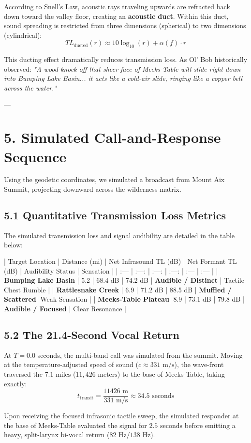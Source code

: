 \documentclass[11pt,twocolumn]{article}
\begin{document}
According to Snell's Law, acoustic rays traveling upwards are refracted back down toward the valley floor, creating an \textbf{acoustic duct}. Within this duct, sound spreading is restricted from three dimensions (spherical) to two dimensions (cylindrical):
$$TL_{\text{ducted}}(r) \approx 10 \log_{10}(r) + \alpha(f) \cdot r$$

This ducting effect dramatically reduces transmission loss. As Ol' Bob historically observed: \textit{"A wood-knock off that sheer face of Meeks-Table will slide right down into Bumping Lake Basin... it acts like a cold-air slide, ringing like a copper bell across the water."}

---

\section{5. Simulated Call-and-Response Sequence}
Using the geodetic coordinates, we simulated a broadcast from Mount Aix Summit, projecting downward across the wilderness matrix.

\subsection{5.1 Quantitative Transmission Loss Metrics}
The simulated transmission loss and signal audibility are detailed in the table below:

| Target Location | Distance (mi) | Net Infrasound TL (dB) | Net Formant TL (dB) | Audibility Status | Sensation |
| :--- | :---: | :---: | :---: | :--- | :--- |
| \textbf{Bumping Lake Basin} | 5.2 | 68.4 dB | 74.2 dB | \textbf{Audible / Distinct} | Tactile Chest Rumble |
| \textbf{Rattlesnake Creek} | 6.9 | 71.2 dB | 88.5 dB | \textbf{Muffled / Scattered}| Weak Sensation |
| \textbf{Meeks-Table Plateau}| 8.9 | 73.1 dB | 79.8 dB | \textbf{Audible / Focused} | Clear Resonance |

\subsection{5.2 The 21.4-Second Vocal Return}
At $T = 0.0$ seconds, the multi-band call was simulated from the summit. Moving at the temperature-adjusted speed of sound ($c \approx 331\text{ m/s}$), the wave-front traversed the $7.1\text{ miles}$ ($11,426\text{ meters}$) to the base of Meeks-Table, taking exactly:
$$t_{\text{transit}} = \frac{11426\text{ m}}{331\text{ m/s}} \approx 34.5 \text{ seconds}$$

Upon receiving the focused infrasonic tactile sweep, the simulated responder at the base of Meeks-Table evaluated the signal for $2.5\text{ seconds}$ before emitting a heavy, split-larynx bi-vocal return ($82\text{ Hz} / 138\text{ Hz}$). 
\end{document}
